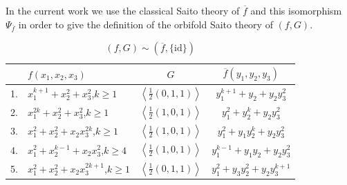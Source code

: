 \documentclass[reqno,12pt]{amsart}
\numberwithin{equation}{section}
\theoremstyle{plain}
\theoremstyle{definition}
\newcommand{\CC}{{\mathbb{C}}}
\newcommand{\Jac}{\mathrm{Jac}}
\newcommand{\id}{\mathrm{id}}
\newcommand{\ccHH}{{\mathsf{HH}}}
\numberwithin{equation}{section}
\begin{document}
In the current work we use the classical Saito theory of $\overline{f}$ and this isomorphism $\Psi_{\overline f}$ in order to give the definition of the orbifold Saito theory of $(f,G)$.

\begin{table}[h]
{\small
\begin{center}
\begin{tabular}{l||l|c||c}
&$f(x_1,x_2,x_3)$ & $G$ & $\overline{f}(y_1,y_2,y_3)$\\
\hline
1.&$x_1^{k+1}+x_2^2+x_3^2$,\quad $k \ge  1$ & $\left<\frac{1}{2}(0,1,1)\right>$ & $y_1^{k+1}+y_2+y_2y_3^2$\\
2.&$x_1^{2k}+x_2^2+x_3^2$,\quad $k \ge  1$ & $\left<\frac{1}{2}(1,0,1)\right>$ & $y_1^2+y_2^k+y_2y_3^2$\\
3.&$x_1^2+x_2^2+x_2x_3^{2k}$,\quad $k \ge  1$ & $\left<\frac{1}{2}(1,0,1)\right>$ & $y_1^2+y_1y_2^k+y_2y_3^2$\\
4.&$x_1^2+x_2^{k-1}+x_2x_3^2$,\quad $k \ge  4$ & $\left<\frac{1}{2}(1,0,1)\right>$ & $y_1^{k-1}+y_1y_2+y_2y_3^2$\\
5.&$x_1^2+x_2^2+x_2x_3^{2k+1}$,\quad $k \ge  1$ & $\left<\frac{1}{2}(0,1,1)\right>$ & $y_1^2+y_3y_2^2+y_2y_3^{k+1}$\\
\hline
\end{tabular}
\end{center}
}
\smallskip
\caption{$(f,G)\sim (\overline{f},\{\id\})$}\label{table1}
\end{table}




\end{document}
